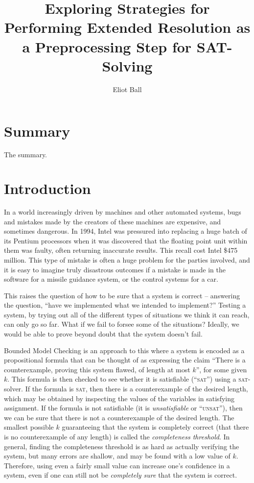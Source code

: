 \documentclass[pdftex,11pt,a4]{article}
\newcommand{\sat}{\textsc{sat}}
\newcommand{\unsat}{\textsc{unsat}}
\begin{document}
\title{\textbf{Exploring Strategies for Performing Extended Resolution as a Preprocessing Step for SAT-Solving}}
\author{Eliot Ball}

\maketitle

\section*{Summary}

The summary.

\tableofcontents

\section{Introduction}

In a world increasingly driven by machines and other automated systems, bugs and mistakes made by the creators of these machines are expensive, and sometimes dangerous. In 1994, Intel was pressured into replacing a huge batch of its Pentium processors when it was discovered that the floating point unit within them was faulty, often returning inaccurate results. This recall cost Intel \$475 million. This type of mistake is often a huge problem for the parties involved, and it is easy to imagine truly disastrous outcomes if a mistake is made in the software for a missile guidance system, or the control systems for a car.

This raises the question of how to be sure that a system is correct -- answering the question, ``have we implemented what we intended to implement?'' Testing a system, by trying out all of the different types of situations we think it can reach, can only go so far. What if we fail to forsee some of the situations? Ideally, we would be able to prove beyond doubt that the system doesn't fail.

Bounded Model Checking is an approach to this where a system is encoded as a propositional formula that can be thought of as expressing the claim ``There is a counterexample, proving this system flawed, of length at most $k$'', for some given $k$. This formula is then checked to see whether it is satisfiable (``\sat'') using a \sat{}-solver. If the formula is \sat, then there is a counterexample of the desired length, which may be obtained by inspecting the values of the variables in satisfying assignment. If the formula is not satisfiable (it is \emph{unsatisfiable} or ``\unsat''), then we can be sure that there is not a counterexample of the desired length. The smallest possible $k$ guaranteeing that the system is completely correct (that there is no counterexample of any length) is called the \emph{completeness threshold}. In general, finding the completeness threshold is as hard as actually verifying the system, but many errors are shallow, and may be found with a low value of $k$. Therefore, using even a fairly small value can increase one's confidence in a system, even if one can still not be \emph{completely sure} that the system is correct.
\end{document}
